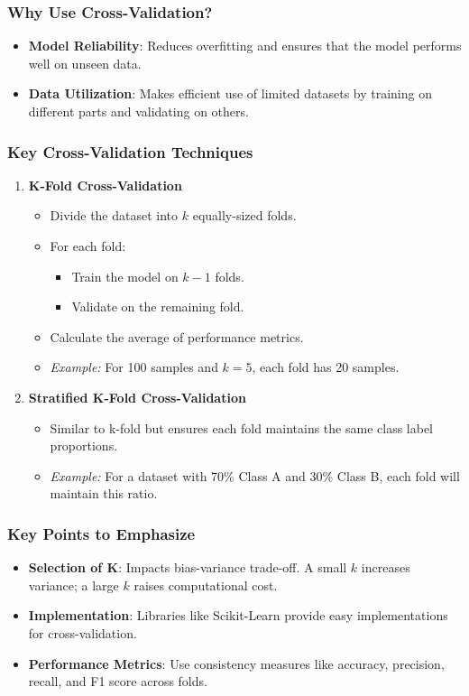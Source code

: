 \documentclass[aspectratio=169]{beamer}
\begin{document}
\begin{frame}
    \frametitle{Why Use Cross-Validation?}
    \begin{itemize}
        \item \textbf{Model Reliability}: Reduces overfitting and ensures that the model performs well on unseen data.
        \item \textbf{Data Utilization}: Makes efficient use of limited datasets by training on different parts and validating on others.
    \end{itemize}
\end{frame}

\begin{frame}
    \frametitle{Key Cross-Validation Techniques}
    \begin{enumerate}
        \item \textbf{K-Fold Cross-Validation}
        \begin{itemize}
            \item Divide the dataset into \(k\) equally-sized folds.
            \item For each fold:
            \begin{itemize}
                \item Train the model on \(k-1\) folds.
                \item Validate on the remaining fold.
            \end{itemize}
            \item Calculate the average of performance metrics.
            \item \textit{Example:} For 100 samples and \(k=5\), each fold has 20 samples.
        \end{itemize}
        
        \item \textbf{Stratified K-Fold Cross-Validation}
        \begin{itemize}
            \item Similar to k-fold but ensures each fold maintains the same class label proportions.
            \item \textit{Example:} For a dataset with 70\% Class A and 30\% Class B, each fold will maintain this ratio.
        \end{itemize}
    \end{enumerate}
\end{frame}

\begin{frame}
    \frametitle{Key Points to Emphasize}
    \begin{itemize}
        \item \textbf{Selection of K}: Impacts bias-variance trade-off. A small \(k\) increases variance; a large \(k\) raises computational cost.
        \item \textbf{Implementation}: Libraries like Scikit-Learn provide easy implementations for cross-validation.
        \item \textbf{Performance Metrics}: Use consistency measures like accuracy, precision, recall, and F1 score across folds.
    \end{itemize}
\end{frame}
\end{document}
